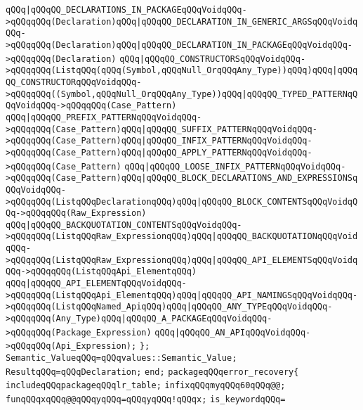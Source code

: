 \verb|qQQq|\verb#|qQQqQQ_DECLARATIONS_IN_PACKAGEqQQqVoidqQQq->qQQqqQQq(Declaration)qQQq|qQQqQQ_DECLARATION_IN_GENERIC_ARGSqQQqVoidqQQq->qQQqqQQq(Declaration)qQQq|qQQqQQ_DECLARATION_IN_PACKAGEqQQqVoidqQQq->qQQqqQQq(Declaration)#\newline
\verb|qQQq|\verb#|qQQqQQ_CONSTRUCTORSqQQqVoidqQQq->qQQqqQQq(ListqQQq(qQQq(Symbol,qQQqNull_OrqQQqAny_Type))qQQq)qQQq|qQQqQQ_CONSTRUCTORqQQqVoidqQQq->qQQqqQQq((Symbol,qQQqNull_OrqQQqAny_Type))qQQq|qQQqQQ_TYPED_PATTERNqQQqVoidqQQq->qQQqqQQq(Case_Pattern)#\newline
\verb|qQQq|\verb#|qQQqQQ_PREFIX_PATTERNqQQqVoidqQQq->qQQqqQQq(Case_Pattern)qQQq|qQQqQQ_SUFFIX_PATTERNqQQqVoidqQQq->qQQqqQQq(Case_Pattern)qQQq|qQQqQQ_INFIX_PATTERNqQQqVoidqQQq->qQQqqQQq(Case_Pattern)qQQq|qQQqQQ_APPLY_PATTERNqQQqVoidqQQq->qQQqqQQq(Case_Pattern)#\newline
\verb|qQQq|\verb#|qQQqQQ_LOOSE_INFIX_PATTERNqQQqVoidqQQq->qQQqqQQq(Case_Pattern)qQQq|qQQqQQ_BLOCK_DECLARATIONS_AND_EXPRESSIONSqQQqVoidqQQq->qQQqqQQq(ListqQQqDeclarationqQQq)qQQq|qQQqQQ_BLOCK_CONTENTSqQQqVoidqQQq->qQQqqQQq(Raw_Expression)#\newline
\verb|qQQq|\verb#|qQQqQQ_BACKQUOTATION_CONTENTSqQQqVoidqQQq->qQQqqQQq(ListqQQqRaw_ExpressionqQQq)qQQq|qQQqQQ_BACKQUOTATIONqQQqVoidqQQq->qQQqqQQq(ListqQQqRaw_ExpressionqQQq)qQQq|qQQqQQ_API_ELEMENTSqQQqVoidqQQq->qQQqqQQq(ListqQQqApi_ElementqQQq)#\newline
\verb|qQQq|\verb#|qQQqQQ_API_ELEMENTqQQqVoidqQQq->qQQqqQQq(ListqQQqApi_ElementqQQq)qQQq|qQQqQQ_API_NAMINGSqQQqVoidqQQq->qQQqqQQq(ListqQQqNamed_ApiqQQq)qQQq|qQQqQQ_ANY_TYPEqQQqVoidqQQq->qQQqqQQq(Any_Type)qQQq|qQQqQQ_A_PACKAGEqQQqVoidqQQq->qQQqqQQq(Package_Expression)#\newline
\verb|qQQq|\verb#|qQQqQQ_AN_APIqQQqVoidqQQq->qQQqqQQq(Api_Expression);#\newline
\verb|};|\newline
\verb|Semantic_ValueqQQq=qQQqvalues::Semantic_Value;|\newline
\verb|ResultqQQq=qQQqDeclaration;|\newline
\verb|end;|\newline
\verb|packageqQQqerror_recovery{|\newline
\verb|includeqQQqpackageqQQqlr_table;|\newline
\verb|infixqQQqmyqQQq60qQQq@@;|\newline
\verb|funqQQqxqQQq@@qQQqyqQQq=qQQqyqQQq!qQQqx;|\newline
\verb|is_keywordqQQq=|\newline
